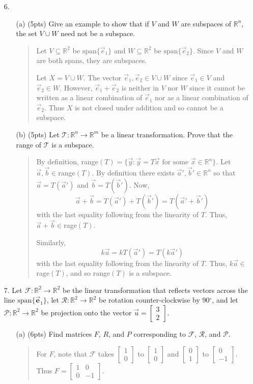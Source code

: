 \documentclass[11pt]{article}
\newcommand{\R}{\mathbb{R}}
\newcommand{\Span}{\mathrm{span}}
\newcommand{\mat}[1]{\begin{bmatrix}#1\end{bmatrix}}
\newenvironment{answer}{\begin{quote}\sffamily}{\end{quote}}
\begin{document}
\begin{enumerate}
	\item[6.] ~
	\begin{enumerate}
		\item[(a) (5pts)] Give an example to show that if $V$ and $W$ are subspaces of $\R^n$, the set $V\cup W$
                need not be a subspace.
		\begin{answer}
			Let $V\subseteq\R^2$ be $\Span\{\vec e_1\}$ and $W\subseteq\R^2$ be $\Span\{\vec e_2\}$.
			Since $V$ and $W$ are both spans, they are subspaces.

			Let $X=V\cup W$.  The vector $\vec e_1,\vec e_2\in V\cup W$ since $\vec e_1\in V$ and
			$\vec e_2\in W$.  However, $\vec e_1+\vec e_2$ is neither in $V$ nor $W$ since it cannot
			be written as a linear combination of $\vec e_1$ nor as a linear combination of $\vec e_2$.
			Thus $X$ is not closed under addition and so cannot be a subspace.
		\end{answer}
		\item[(b) (5pts)] Let $\mathcal T:\R^n\to\R^m$ be a linear transformation.  Prove that
		the range of $\mathcal T$ is a subspace.
		\begin{answer}
			By definition, range$(T)=\{\vec y:\vec y=T\vec x\text{ for some }\vec x\in\R^n\}$.
			Let $\vec a,\vec b\in$range$(T)$.  By definition there exists $\vec a',\vec b'\in\R^n$
			so that $\vec a=T(\vec a')$ and $\vec b=T(\vec b')$.  Now,
			\[
				\vec a+\vec b=T(\vec a')+T(\vec b')=T(\vec a'+\vec b')
			\]
			with the last equality following from the linearity of $T$.  Thus, $\vec a+\vec b\in$rage$(T)$.

			Similarly,
			\[
				k\vec a= kT(\vec a')=T(k\vec a')
			\]
			with the last equality following from the linearity of $T$.  Thus, $k\vec a\in$rage$(T)$,
			and so range$(T)$ is a subspace.
		\end{answer}
	\end{enumerate}

	\newpage
	\item[7.] Let $\mathcal F:\R^2\to\R^2$ be the linear transformation that reflects vectors
	across the line $\Span\{\vec{\mathbf{e}}_1\}$, let $\mathcal R:\R^2\to\R^2$ be rotation
	counter-clockwise by 90$^\circ$, and let $\mathcal P:\R^2\to\R^2$ be projection onto the 
	vector $\vec u=\mat{3\\2}$.
	\begin{enumerate}
		\item[(a) (6pts)] Find matrices $F$, $R$, and $P$ corresponding to $\mathcal F$, $\mathcal R$,
		and $\mathcal P$.
		\begin{answer}
			For $F$, note that $\mathcal{F}$ takes $\mat{1\\0}$ to $\mat{1\\0}$ and $\mat{0\\1}$ to $\mat{0\\-1}$.  Thus $F = \mat{1 & 0\\0 & -1}$.
			

\end{answer}
\end{enumerate}
\end{enumerate}
\end{document}
